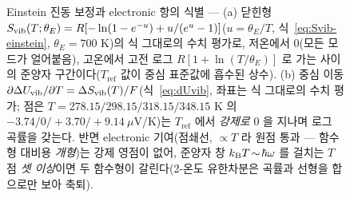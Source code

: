 \begin{figure}[t]
\caption{Einstein 진동 보정과 electronic 항의 식별 --- (a) 닫힌형 $S_{\mathrm{vib}}(T;\theta_{E})=R[-\ln(1-e^{-u})
+u/(e^{u}-1)]$($u{=}\theta_E/T$, 식~\eqref{eq:Svib-einstein}, $\theta_E{=}700$ K)의 식 그대로의 수치
평가로, 저온에서 $0$(모든 모드가 얼어붙음), 고온에서 고전 로그 $R[1{+}\ln(T/\theta_E)]$ 로 가는 사이의
준양자 구간이다($T_\mathrm{ref}$ 값이 중심 표준값에 흡수된 상수). (b) 중심 이동
$\partial\Delta U_{\mathrm{vib}}/\partial T=\Delta S_{\mathrm{vib}}(T)/F$(식~\eqref{eq:dUvib}, 좌표는 식 그대로의 수치 평가; 점은
$T{=}278.15/298.15/318.15/348.15$ K 의 $-3.74/0/{+}3.70/{+}9.14~\mu$V/K)는 $T_\mathrm{ref}$ 에서 \emph{강제로}
$0$ 을 지나며 로그 곡률을 갖는다. 반면 electronic 기여(점쇄선, $\propto T$ 라 원점 통과 --- 함수형 대비용
\emph{개형})는 강제 영점이 없어, 준양자 창 $k_{\mathrm B} T\!\sim\!\hbar\omega$ 를 걸치는 $T$ 점 \emph{셋 이상}이면 두
함수형이 갈린다(2-온도 유한차분은 곡률과 선형을 합으로만 보아 축퇴).}
\label{fig:cand-fo1-4}
\end{figure}
